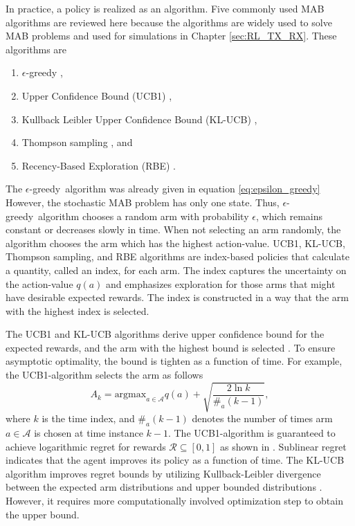\documentclass[english, 12pt, a4paper, elec, utf8, a-1b, online]{aaltothesis}
\newcommand{\As}{\mathcal{A}}
\newcommand{\Rs}{\mathcal{R}}
\newcommand{\argmax}{\text{argmax}}
\newcommand{\egreedy}{$\epsilon$-greedy~}
\begin{document}
In practice, a policy is realized as an algorithm.
Five commonly used MAB algorithms are reviewed here because the algorithms are widely used to solve MAB problems and used for simulations in Chapter \ref{sec:RL_TX_RX}.
These algorithms are
\begin{enumerate}
    \item $\epsilon$-greedy \cite{Sutton2018},
    \item Upper Confidence Bound (UCB1) \cite{Auer2002, Garivier2008},
    \item Kullback Leibler Upper Confidence Bound (KL-UCB) \cite{Garivier2011},
    \item Thompson sampling \cite{Agrawal2012, Raj2017}, and
    \item Recency-Based Exploration (RBE) \cite{Oksanen2015,Oksanen2017}.
\end{enumerate}
The \egreedy algorithm was already given in equation \eqref{eq:epsilon_greedy} 
However, the stochastic MAB problem has only one state.
Thus, \egreedy algorithm chooses a random arm with probability $\epsilon$, which remains constant or decreases slowly in time. 
When not selecting an arm randomly, the algorithm chooses the arm which has the highest action-value.
UCB1, KL-UCB, Thompson sampling, and RBE algorithms are index-based policies that calculate a quantity, called an index, for each arm.
The index captures the uncertainty on the action-value $q(a)$ and emphasizes exploration for those arms that might have desirable expected rewards.
The index is constructed in a way that the arm with the highest index is selected.

The UCB1 and KL-UCB algorithms derive upper confidence bound for the expected rewards, and the arm with the highest bound is selected \cite{Auer2002, Garivier2011}.
To ensure asymptotic optimality, the bound is tighten as a function of time.
For example, the UCB1-algorithm selects the arm as follows \cite{Auer2002}
\begin{equation}
    A_k = \argmax_{a \in \As} q(a) + \sqrt{\frac{2 \ln{k}}{\#_a(k-1)}},
\end{equation}
where $k$ is the time index, and $\#_a(k-1)$ denotes the number of times arm $a \in \As$ is chosen at time instance $k-1$.
The UCB1-algorithm is guaranteed to achieve logarithmic regret for rewards $\Rs \subseteq [0, 1]$ as shown in \cite{Auer2002}.
Sublinear regret indicates that the agent improves its policy as a function of time.
The KL-UCB algorithm improves regret bounds by utilizing Kullback-Leibler divergence between the expected arm distributions and upper bounded distributions \cite{Garivier2011}.
However, it requires more computationally involved optimization step to obtain the upper bound.
\end{document}

